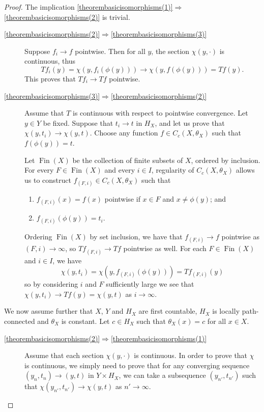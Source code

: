 \documentclass[letter,11pt]{amsart}
\theoremstyle{plain}		\newtheorem{theorem}[generalnumbering]{Theorem}
\theoremstyle{plain}		\newtheorem{corollary}[generalnumbering]{Corollary}
\theoremstyle{definition}		\newtheorem{definition}[generalnumbering]{Definition}
\theoremstyle{definition}		\newtheorem{example}[generalnumbering]{Example}
\theoremstyle{plain}		\newtheorem{proposition}[generalnumbering]{Proposition}
\theoremstyle{plain}		\newtheorem{lemma}[generalnumbering]{Lemma}
\theoremstyle{definition}
\begin{document}
\begin{proof}
	The implication \ref{theorembasicisomorphisms(1)}$\Rightarrow$\ref{theorembasicisomorphisms(2)} is trivial.
	
	\begin{description}
		\item[\ref{theorembasicisomorphisms(2)}$\Rightarrow$\ref{theorembasicisomorphisms(3)}] Suppose $f_i\to f$ pointwise. Then for all $y$, the section $\chi(y,\cdot)$ is continuous, thus
		\[Tf_i(y)=\chi(y,f_i(\phi(y)))\to\chi(y,f(\phi(y)))=Tf(y).\]
		This proves that $Tf_i\to Tf$ pointwise.
		\item[\ref{theorembasicisomorphisms(3)}$\Rightarrow$\ref{theorembasicisomorphisms(2)}] Assume that $T$ is continuous with respect to pointwise convergence. Let $y\in Y$ be fixed. Suppose that $t_i\to t$ in $H_X$, and let us prove that $\chi(y,t_i)\to\chi(y,t)$. Choose any function $f\in C_c(X,\theta_X)$ such that $f(\phi(y))=t$.
		
		Let $\operatorname{Fin}(X)$ be the collection of finite subsets of $X$, ordered by inclusion. For every $F\in\operatorname{Fin}(X)$ and every $i\in I$, regularity of $C_c(X,\theta_X)$ allows us to construct $f_{(F,i)}\in C_c(X,\theta_X)$ such that
		\begin{enumerate}[label=(\roman*)]
			\item $f_{(F,i)}(x)=f(x)$ pointwise if $x\in F$ and $x\neq \phi(y)$; and
			\item $f_{(F,i)}(\phi(y))=t_i$.
		\end{enumerate}
		Ordering $\operatorname{Fin}(X)$ by set inclusion, we have that $f_{(F,i)}\to f$ pointwise as $(F,i)\to\infty$, so $Tf_{(F,i)}\to Tf$ pointwise as well. For each $F\in\operatorname{Fin}(X)$ and $i\in I$, we have
		\[\chi(y,t_i)=\chi(y,f_{(F,i)}(\phi(y)))=Tf_{(F,i)}(y)\]
		so by considering $i$ and $F$ sufficiently large we see that $\chi(y,t_i)\to Tf(y)=\chi(y,t)$ as $i\to\infty$.
	\end{description}
	
	We now assume further that $X$, $Y$ and $H_X$ are first countable, $H_X$ is locally path-connected and $\theta_X$ is constant. Let $c\in H_X$ such that $\theta_X(x)=c$ for all $x\in X$.
	\begin{description}
		\item[\ref{theorembasicisomorphisms(2)}$\Rightarrow$\ref{theorembasicisomorphisms(1)}] Assume that each section $\chi(y,\cdot)$ is continuous. In order to prove that $\chi$ is continuous, we simply need to prove that for any converging sequence $(y_n,t_n)\to (y,t)$ in $Y\times H_X$, we can take a subsequence $(y_{n'},t_{n'})$ such that $\chi(y_{n'},t_{n'})\to \chi(y,t)$ as $n'\to\infty$.
		

\end{description}
\end{proof}
\end{document}
